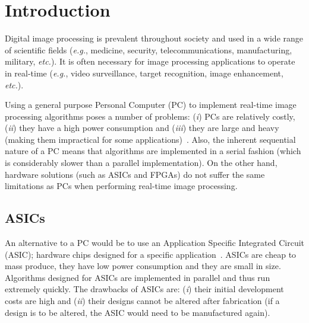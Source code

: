 \documentclass[10pt,twocolumn,letterpaper]{article}
\begin{document}
\section{Introduction}
%
%
%
%
Digital image processing is prevalent throughout society and used in a wide
range of scientific fields (\emph{e.g.},
medicine, security, telecommunications, manufacturing, military, \emph{etc.}). 
It is often necessary for image processing applications to operate in real-time 
(\emph{e.g.}, video surveillance, target recognition, image enhancement, \emph{etc.}). 

Using a general purpose Personal Computer (PC) to implement real-time image processing algorithms 
poses a number of problems: (\emph{i}) PCs are relatively costly, (\emph{ii}) they have a high power consumption and (\emph{iii})
they are large and heavy (making them impractical for some applications)~\cite{johnson02}. Also, the inherent sequential nature 
of a PC means that algorithms are implemented in a serial fashion (which is considerably slower than a parallel implementation).
On the other hand, hardware solutions (such as ASICs and FPGAs) do not suffer the same limitations as PCs when performing real-time
image processing.

\subsection{ASICs}
An alternative to a PC would be to use an Application Specific Integrated Circuit (ASIC); hardware
chips designed for a specific application~\cite{bouri99}. ASICs are cheap to mass produce, they have low power consumption and they are small in size.
Algorithms designed for ASICs are implemented in parallel and thus run extremely quickly. 
The drawbacks of ASICs are: (\emph{i}) their initial development costs are high and (\emph{ii}) their designs
cannot be altered after fabrication (if a design is to be altered, the ASIC would need to be manufactured again).
\end{document}
